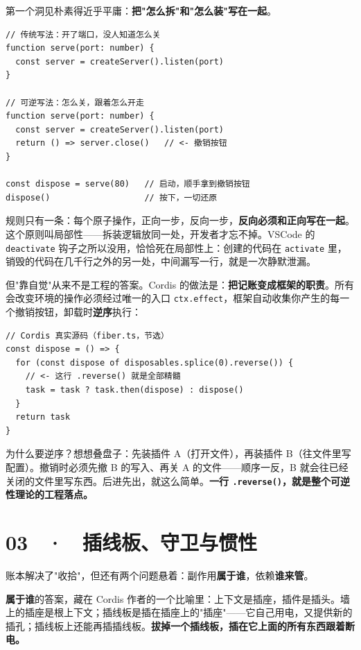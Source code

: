 \documentclass[11pt,a4paper]{article}
\begin{document}
第一个洞见朴素得近乎平庸：\textbf{把"怎么拆"和"怎么装"写在一起}。

\begin{lstlisting}
// 传统写法：开了端口，没人知道怎么关
function serve(port: number) {
  const server = createServer().listen(port)
}

// 可逆写法：怎么关，跟着怎么开走
function serve(port: number) {
  const server = createServer().listen(port)
  return () => server.close()   // <- 撤销按钮
}

const dispose = serve(80)   // 启动，顺手拿到撤销按钮
dispose()                   // 按下，一切还原
\end{lstlisting}

规则只有一条：每个原子操作，正向一步，反向一步，\textbf{反向必须和正向写在一起}。这个原则叫局部性——拆装逻辑放同一处，开发者才忘不掉。VSCode 的 \texttt{deactivate} 钩子之所以没用，恰恰死在局部性上：创建的代码在 \texttt{activate} 里，销毁的代码在几千行之外的另一处，中间漏写一行，就是一次静默泄漏。

但"靠自觉"从来不是工程的答案。Cordis 的做法是：\textbf{把记账变成框架的职责}。所有会改变环境的操作必须经过唯一的入口 \texttt{ctx.effect}，框架自动收集你产生的每一个撤销按钮，卸载时\textbf{逆序}执行：

\begin{lstlisting}
// Cordis 真实源码（fiber.ts，节选）
const dispose = () => {
  for (const dispose of disposables.splice(0).reverse()) {
    // <- 这行 .reverse() 就是全部精髓
    task = task ? task.then(dispose) : dispose()
  }
  return task
}
\end{lstlisting}

\begin{center}

\end{center}

为什么要逆序？想想叠盘子：先装插件 A（打开文件），再装插件 B（往文件里写配置）。撤销时必须先撤 B 的写入、再关 A 的文件——顺序一反，B 就会往已经关闭的文件里写东西。后进先出，就这么简单。\textbf{一行 \texttt{.reverse()}，就是整个可逆性理论的工程落点。}

\section*{03 \ · \ 插线板、守卫与惯性}

账本解决了"收拾"，但还有两个问题悬着：副作用\textbf{属于谁}，依赖\textbf{谁来管}。

\textbf{属于谁}的答案，藏在 Cordis 作者的一个比喻里：上下文是插座，插件是插头。墙上的插座是根上下文；插线板是插在插座上的"插座"——它自己用电，又提供新的插孔；插线板上还能再插插线板。\textbf{拔掉一个插线板，插在它上面的所有东西跟着断电。}
\end{document}
